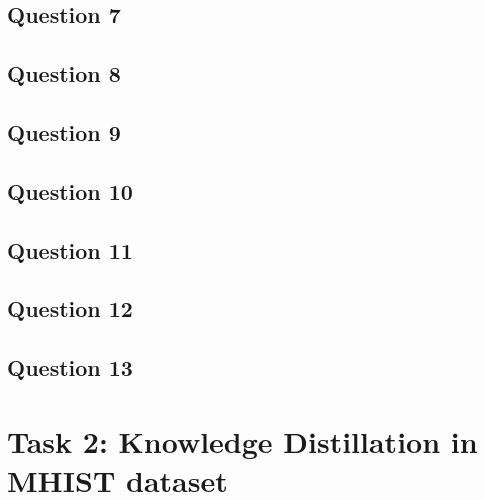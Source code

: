 \documentclass[conference]{IEEEtran}
\begin{document}
\subsection{Question 7}

\subsection{Question 8}

\subsection{Question 9}

\subsection{Question 10}

\subsection{Question 11}

\subsection{Question 12}

\subsection{Question 13}

\section{Task 2: Knowledge Distillation in MHIST dataset}
\end{document}
